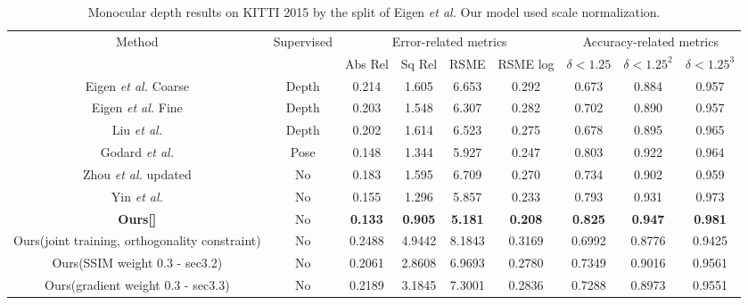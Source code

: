 \documentclass[10pt,twocolumn,letterpaper]{article}
\begin{document}
\begin{table}[htbp]
\centering
\begin{tabular}{ c||c| c c c c|c c c  }
 \hline
  \multirow{2}{*}{Method} & \multirow{2}{*}{Supervised} & \multicolumn{4}{c|}{Error-related metrics} & \multicolumn{3}{c}{Accuracy-related metrics}\\
  &   & Abs Rel & Sq Rel & RSME & RSME log & $\delta < 1.25$ & $\delta < 1.25^2$ & $\delta < 1.25^3$\\
 \hline
 Eigen \textit{et al.} \cite{eigen2014depth} Coarse & Depth & 0.214 & 1.605 & 6.653 & 0.292 & 0.673 & 0.884 & 0.957 \\

  Eigen \textit{et al.} \cite{eigen2014depth} Fine & Depth & 0.203 & 1.548 & 6.307 & 0.282 & 0.702 & 0.890 & 0.957 \\

  Liu \textit{et al.}  \cite{liu2016learning} & Depth & 0.202 & 1.614 & 6.523 & 0.275 & 0.678 & 0.895 & 0.965 \\

  Godard \textit{et al.} \cite{godard2017unsupervised}  & Pose & 0.148 & 1.344 & 5.927 & 0.247 & 0.803 & 0.922 & 0.964 \\

  Zhou \textit{et al.} \cite{zhou2017unsupervised} updated & No & 0.183 & 1.595 & 6.709 & 0.270 & 0.734 & 0.902 & 0.959\\

  Yin \textit{et al.} \cite{yin2018geonet} & No & 0.155 & 1.296 & 5.857 & 0.233 & 0.793 & 0.931 & 0.973 \\

  \hline
  \textbf{Ours[]} & No & \textbf{0.133} &     \textbf{0.905} &     \textbf{5.181} &     \textbf{0.208} &     \textbf{0.825} &     \textbf{0.947} &     \textbf{0.981}\\
  
  Ours(joint training, orthogonality constraint) & No & 0.2488 & 4.9442 & 8.1843 & 0.3169 & 0.6992 & 0.8776 & 0.9425 \\
  
  Ours(SSIM weight 0.3 - sec3.2) & No &  0.2061 & 2.8608 & 6.9693 & 0.2780 & 0.7349 & 0.9016 &     0.9561 \\
  
  Ours(gradient weight 0.3 - sec3.3) & No & 0.2189 & 3.1845 & 7.3001 & 0.2836 & 0.7288 & 0.8973 &  0.9551 \\
 \hline
\end{tabular}
\caption{Monocular depth results on KITTI 2015 \cite{menze2015object} by the split of Eigen
\textit{et al.} \cite{eigen2014depth} Our model used scale normalization.}\label{tab:depth_pred}
\end{table}
\end{document}
